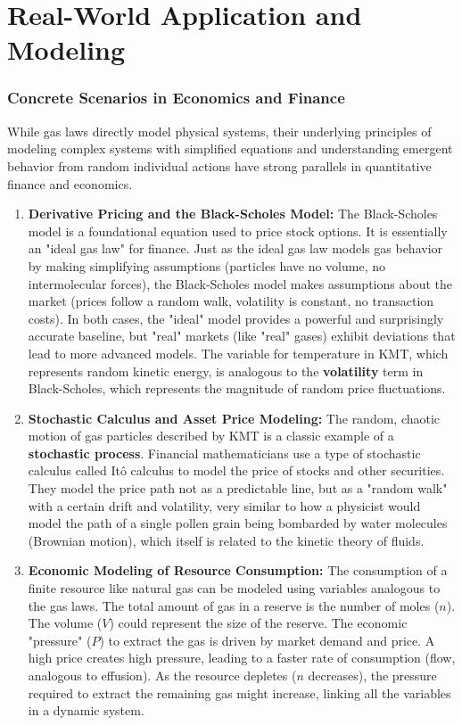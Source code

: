 \documentclass{article}
\begin{document}
\part{Real-World Application and Modeling}

\section{Concrete Scenarios in Economics and Finance}
While gas laws directly model physical systems, their underlying principles of modeling complex systems with simplified equations and understanding emergent behavior from random individual actions have strong parallels in quantitative finance and economics.

\begin{enumerate}
    \item \textbf{Derivative Pricing and the Black-Scholes Model:} The Black-Scholes model is a foundational equation used to price stock options. It is essentially an "ideal gas law" for finance. Just as the ideal gas law models gas behavior by making simplifying assumptions (particles have no volume, no intermolecular forces), the Black-Scholes model makes assumptions about the market (prices follow a random walk, volatility is constant, no transaction costs). In both cases, the "ideal" model provides a powerful and surprisingly accurate baseline, but "real" markets (like "real" gases) exhibit deviations that lead to more advanced models. The variable for temperature in KMT, which represents random kinetic energy, is analogous to the \textbf{volatility} term in Black-Scholes, which represents the magnitude of random price fluctuations.

    \item \textbf{Stochastic Calculus and Asset Price Modeling:} The random, chaotic motion of gas particles described by KMT is a classic example of a \textbf{stochastic process}. Financial mathematicians use a type of stochastic calculus called It\^{o} calculus to model the price of stocks and other securities. They model the price path not as a predictable line, but as a "random walk" with a certain drift and volatility, very similar to how a physicist would model the path of a single pollen grain being bombarded by water molecules (Brownian motion), which itself is related to the kinetic theory of fluids.

    \item \textbf{Economic Modeling of Resource Consumption:} The consumption of a finite resource like natural gas can be modeled using variables analogous to the gas laws. The total amount of gas in a reserve is the number of moles ($n$). The volume ($V$) could represent the size of the reserve. The economic "pressure" ($P$) to extract the gas is driven by market demand and price. A high price creates high pressure, leading to a faster rate of consumption (flow, analogous to effusion). As the resource depletes ($n$ decreases), the pressure required to extract the remaining gas might increase, linking all the variables in a dynamic system.
\end{enumerate}
\end{document}
